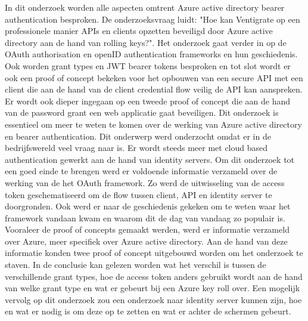 In dit onderzoek worden alle aspecten omtrent Azure active directory bearer authentication besproken. De onderzoeksvraag luidt: "Hoe kan Ventigrate op een professionele manier APIs en clients opzetten beveiligd door Azure active directory aan de hand van rolling keys?". Het onderzoek gaat verder in op de OAuth authorisation en openID authentication frameworks en hun geschiedenis. Ook worden grant types en JWT bearer tokens besproken en tot slot wordt er ook een proof of concept bekeken voor het opbouwen van een secure API met een client die aan de hand van de client credential flow veilig de API kan aanspreken. Er wordt ook dieper ingegaan op een tweede proof of concept die aan de hand van de password grant een web applicatie gaat beveiligen.\newline\newline
Dit onderzoek is essentieel om meer te weten te komen over de werking van Azure active directory en bearer authentication. Dit onderwerp werd onderzocht omdat er in de bedrijfswereld veel vraag naar is. Er wordt steeds meer met cloud based authentication gewerkt aan de hand van identity servers.	\newline\newline
Om dit onderzoek tot een goed einde te brengen werd er voldoende informatie verzameld over de werking van de het OAuth framework. Zo werd de uitwisseling van de access token geschematiseerd om de flow tussen client, API en identity server te doorgronden. Ook werd er naar de geschiedenis gekeken om te weten waar het framework vandaan kwam en waarom dit de dag van vandaag zo populair is. Vooraleer de proof of concepts gemaakt werden, werd er informatie verzameld over Azure, meer specifiek over Azure active directory. Aan de hand van deze informatie konden twee proof of concept uitgebouwd worden om het onderzoek te staven. In de conclusie kan gelezen worden wat het verschil is tussen de verschillende grant types, hoe de access token anders gebruikt wordt aan de hand van welke grant type en wat er gebeurt bij een Azure key roll over. Een mogelijk vervolg op dit onderzoek zou een onderzoek naar identity server kunnen zijn, hoe en wat er nodig is om deze op te zetten en wat er achter de schermen gebeurt.